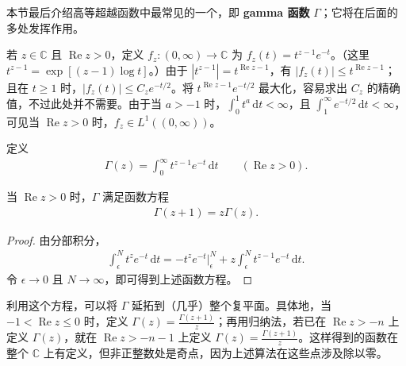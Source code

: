 \documentclass[../../main.tex]{subfiles}%
\begin{document}
本节最后介绍高等超越函数中最常见的一个，即 \textbf{gamma 函数} $\Gamma$；它将在后面的多处发挥作用。

若 $z\in\mathbb{C}$ 且 $\operatorname{Re}z>0$，定义 $f_z:(0,\infty)\to\mathbb{C}$ 为 $f_z(t)=t^{z-1}e^{-t}$。（这里 $t^{z-1}=\exp[(z-1)\log t]$。）由于 $|t^{z-1}|=t^{\operatorname{Re}z-1}$，有 $|f_z(t)|\le t^{\operatorname{Re}z-1}$；且在 $t\ge1$ 时，$|f_z(t)|\le C_ze^{-t/2}$。将 $t^{\operatorname{Re}z-1}e^{-t/2}$ 最大化，容易求出 $C_z$ 的精确值，不过此处并不需要。由于当 $a>-1$ 时，$\int_0^1t^a\,\mathrm{d}t<\infty$，且 $\int_1^\infty e^{-t/2}\,\mathrm{d}t<\infty$，可见当 $\operatorname{Re}z>0$ 时，$f_z\in L^1((0,\infty))$。
\begin{definition}[gamma 函数]\label{definition:ch02-gamma}
定义
\begin{align*}
\Gamma(z)=\int_0^\infty t^{z-1}e^{-t}\,\mathrm{d}t\qquad(\operatorname{Re}z>0).
\end{align*}
\end{definition}
\begin{proposition}\label{proposition:ch02-gamma-functional-equation}
当 $\operatorname{Re}z>0$ 时，$\Gamma$ 满足函数方程
\begin{align*}
\Gamma(z+1)=z\Gamma(z).
\end{align*}
\end{proposition}
\begin{proof}
由分部积分，
\begin{align*}
\int_\epsilon^N t^ze^{-t}\,\mathrm{d}t=-t^ze^{-t}\Big|_\epsilon^N+z\int_\epsilon^N t^{z-1}e^{-t}\,\mathrm{d}t.
\end{align*}
令 $\epsilon\to0$ 且 $N\to\infty$，即可得到上述函数方程。
\end{proof}
\begin{definition}\label{definition:ch02-gamma-extension}
利用这个方程，可以将 $\Gamma$ 延拓到（几乎）整个复平面。具体地，当 $-1<\operatorname{Re}z\le0$ 时，定义 $\Gamma(z)=\frac{\Gamma(z+1)}{z}$；再用归纳法，若已在 $\operatorname{Re}z>-n$ 上定义 $\Gamma(z)$，就在 $\operatorname{Re}z>-n-1$ 上定义 $\Gamma(z)=\frac{\Gamma(z+1)}{z}$。这样得到的函数在整个 $\mathbb{C}$ 上有定义，但非正整数处是奇点，因为上述算法在这些点涉及除以零。
\end{definition}
\end{document}

